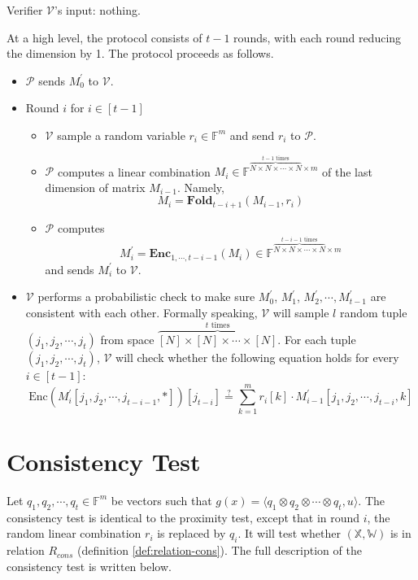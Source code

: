 Verifier $\mathcal{V}$'s input: nothing.

At a high level, the protocol consists of $t-1$ rounds, with each round reducing the dimension by 1. The protocol proceeds as follows. 

\begin{itemize}
    \item $\mathcal{P}$ sends $M_0^{\prime}$ to $\mathcal{V}$.
    
    \item Round $i$ for $i \in [t-1]$
    
    \begin{itemize}
        \item $\mathcal{V}$ sample a random variable $r_i \in \mathbb{F}^m$ and send $r_i$ to $\mathcal{P}$.
        \item $\mathcal{P}$ computes a linear combination 
        $M_i \in \mathbb{F}^{\overbrace{N \times N \times \cdots \times N}^{t-1 \text{ times}} \times m}$ of the last dimension of matrix $M_{i-1}$.
        Namely,
$$
    M_i = \textbf{Fold}_{t-i+1}(M_{i-1}, r_i)
$$

        \item $\mathcal{P}$ computes 
$$
    M_i^\prime =  \textbf{Enc}_{1,\cdots,t-i-1}(M_i)\in \mathbb{F}^{\overbrace{N \times N \times \cdots \times N}^{t-i-1 \text{ times}} \times m}
$$    
        and sends $M_i^\prime$ to $\mathcal{V}$.
    \end{itemize}
    
    \item $\mathcal{V}$ performs a probabilistic check to make sure $M_0^\prime$, $M_1^\prime$, $M_2^\prime, \cdots, M_{t-1}^\prime$ are consistent with each other. Formally speaking, $\mathcal{V}$ will sample $l$ random tuple $(j_1, j_2, \cdots, j_t)$ from space $\overbrace{[N] \times [N] \times \cdots \times [N]}^{t \text{ times}}$. 
    For each tuple $(j_1, j_2, \cdots, j_t)$, 
    $\mathcal{V}$ will check whether the following equation holds for every $i \in [t-1]$:
$$
    \text{Enc}(M_i^\prime[j_1, j_2, \cdots, j_{t-i-1}, *])[j_{t-i}] \stackrel{?}{=} \sum_{k=1}^m r_i[k] \cdot M_{i-1}^{\prime}[j_1,j_2, \cdots, j_{t-i},k]
$$
\end{itemize}

\section{Consistency Test}

Let $q_1, q_2, \cdots, q_t \in \mathbb{F}^{m}$ be vectors such that $g(x) =\langle q_1 \otimes q_2 \otimes \cdots \otimes q_t, u \rangle $. The consistency test is identical to the proximity test, except that in round $i$, the random linear combination $r_i$ is replaced by $q_i$. It will test whether $(\mathbb{X}, \mathbb{W})$ is in relation $R_{cons}$ (definition \ref{def:relation-cons}). The full description of the consistency test is written below.

